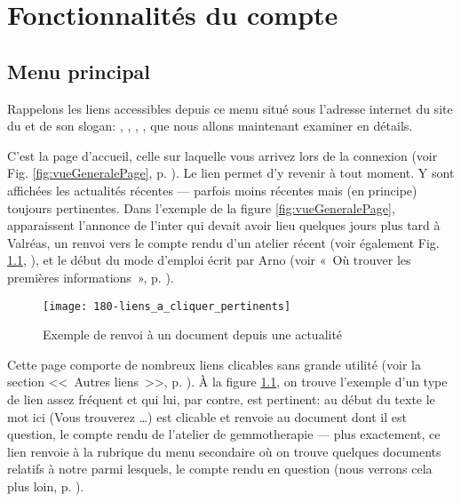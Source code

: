 \chapter{Fonctionnalités du compte}

\section{Menu principal}

Rappelons les liens accessibles depuis ce menu situé sous l'adresse internet du site du \CdS{} et de son slogan: , , , ,  que nous allons maintenant examiner en détails.

C’est la page d’accueil, celle sur laquelle vous arrivez lors de la connexion (voir Fig. \ref{fig:vueGeneralePage}, p. \pageref{fig:vueGeneralePage}). Le lien  permet d’y revenir à tout moment.  Y sont affichées les actualités récentes --- parfois moins récentes mais (en principe) toujours pertinentes. Dans l’exemple de la figure \ref{fig:vueGeneralePage}, apparaissent l’annonce de l’inter\sel{} qui devait avoir lieu quelques jours plus tard à Valréas, un renvoi vers le compte rendu d’un atelier récent (voir également Fig. \ref{fig:liensPertinents}, ), et le début du mode d’emploi écrit par Arno (voir «~Où trouver les premières informations~», p. \pageref{page:premieresInfos}).
\begin{figure}
    \texttt{[image: 180-liens\_a\_cliquer\_pertinents]}
    \caption{Exemple de renvoi à un document depuis une actualité}
    \label{fig:liensPertinents}
\end{figure}

Cette page comporte de nombreux liens clicables sans grande utilité (voir la section <<~Autres liens~>>, p. \pageref{page:autresLiens}). \label{page:lienIci}À la figure \ref{fig:liensPertinents}, on trouve l'exemple d'un type de lien assez fréquent et qui lui, par contre, est pertinent: au début du texte le mot ici (Vous trouverez  …) est clicable et renvoie au document dont il est question, \cad{} le compte rendu de l’atelier de gemmotherapie --- plus exactement, ce lien renvoie à la rubrique  du menu secondaire où on trouve quelques documents relatifs à notre \sel{} parmi lesquels, le compte rendu en question (nous verrons cela plus loin, p. \pageref{sec:docs}).

